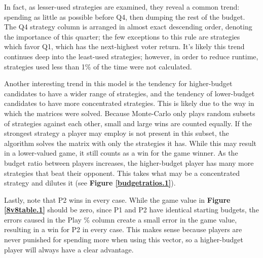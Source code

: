 \documentclass[11pt]{article}
\begin{document}
In fact, as lesser-used strategies are examined, they reveal a common trend: spending as little as possible before Q4, then dumping the rest of the budget. The Q4 strategy column is arranged in almost exact descending order, denoting the importance of this quarter; the few exceptions to this rule are strategies which favor Q1, which has the next-highest voter return. It's likely this trend continues deep into the least-used strategies; however, in order to reduce runtime, strategies used less than 1\% of the time were not calculated.

Another interesting trend in this model is the tendency for higher-budget
candidates to have a wider range of strategies, and the tendency of
lower-budget candidates to have more concentrated strategies. This is likely
due to the way in which the matrices were solved. Because Monte-Carlo only
plays random subsets of strategies against each other, small and large wins are
counted equally. If the strongest strategy a player may employ is not present
in this subset, the algorithm solves the matrix with only the strategies it
has. While this may result in a lower-valued game, it still counts as a win for
the game winner. As the budget ratio between players increases, the
higher-budget player has many more strategies that beat their opponent. This
takes what may be a concentrated strategy and dilutes it (see \textbf{Figure
\ref{budgetratios.1}}).

Lastly, note that P2 wins in every case. While the game value in \textbf{Figure \ref{8v8table.1}} should be zero, since P1 and P2 have identical starting budgets, the errors caused in the Play \% column create a small error in the game value, resulting in a win for P2 in every case. This makes sense because players are never punished for spending more when using this vector, so a higher-budget player will always have a clear advantage. 
\end{document}
